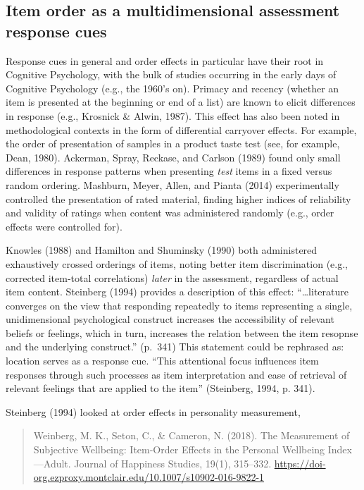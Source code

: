\documentclass[
  man]{apa6}
\begin{document}
\hypertarget{item-order-as-a-multidimensional-assessment-response-cues}{%
\subsection{Item order as a multidimensional assessment response cues}\label{item-order-as-a-multidimensional-assessment-response-cues}}

Response cues in general and order effects in particular have their root in Cognitive Psychology, with the bulk of studies occurring in the early days of Cognitive Psychology (e.g., the 1960's on). Primacy and recency (whether an item is presented at the beginning or end of a list) are known to elicit differences in response (e.g., Krosnick \& Alwin, 1987). This effect has also been noted in methodological contexts in the form of differential carryover effects. For example, the order of presentation of samples in a product taste test (see, for example, Dean, 1980). Ackerman, Spray, Reckase, and Carlson (1989) found only small differences in response patterns when presenting \emph{test} items in a fixed versus random ordering. Mashburn, Meyer, Allen, and Pianta (2014) experimentally controlled the presentation of rated material, finding higher indices of reliability and validity of ratings when content was administered randomly (e.g., order effects were controlled for).

Knowles (1988) and Hamilton and Shuminsky (1990) both administered exhaustively crossed orderings of items, noting better item discrimination (e.g., corrected item-total correlations) \emph{later} in the assessment, regardless of actual item content. Steinberg (1994) provides a description of this effect: ``\ldots literature converges on the view that responding repeatedly to items representing a single, unidimensional psychological construct increases the accessibility of relevant beliefs or feelings, which in turn, increases the relation between the item resopnse and the underlying construct.'' (p.~341) This statement could be rephrased as: location serves as a response cue. ``This attentional focus influences item responses through such processes as item interpretation and ease of retrieval of relevant feelings that are applied to the item'' (Steinberg, 1994, p. 341).

Steinberg (1994) looked at order effects in personality measurement,

\begin{quote}
Weinberg, M. K., Seton, C., \& Cameron, N. (2018). The Measurement of Subjective Wellbeing: Item-Order Effects in the Personal Wellbeing Index---Adult. Journal of Happiness Studies, 19(1), 315--332. \url{https://doi-org.ezproxy.montclair.edu/10.1007/s10902-016-9822-1}
\end{quote}
\end{document}
